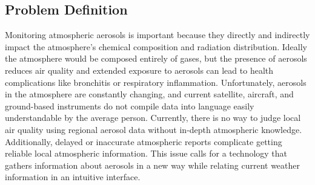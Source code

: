 \documentclass[letterpaper,10pt,draftclsnofoot,onecolumn]{IEEEtran}
\newcommand\tab[1][1cm]{\hspace*{#1}}
\begin{document}
\clearpage
\begin{flushleft}
\section{Problem Definition}
\tab Monitoring atmospheric aerosols is important because they directly and indirectly impact the atmosphere's chemical composition and radiation distribution. Ideally the atmosphere would be composed entirely of gases, but the presence of aerosols reduces air quality and extended exposure to aerosols can lead to health complications like bronchitis or respiratory inflammation. Unfortunately, aerosols in the atmosphere are constantly changing, and current satellite, aircraft, and ground-based instruments do not compile data into language easily understandable by the average person. Currently, there is no way to judge local air quality using regional aerosol data without in-depth atmospheric knowledge. Additionally, delayed or inaccurate atmospheric reports complicate getting reliable local atmospheric information. This issue calls for a technology that gathers information about aerosols in a new way while relating current weather information in an intuitive interface.


\end{flushleft}
\end{document}

